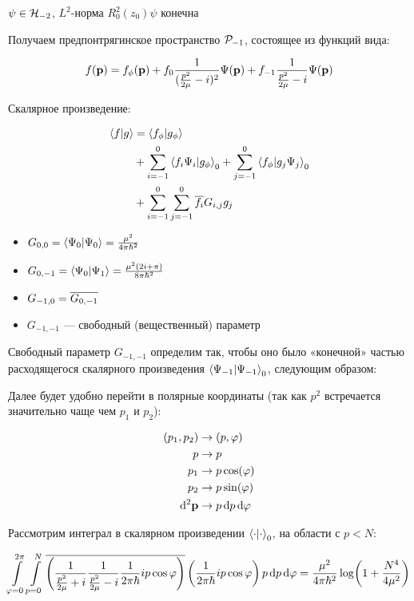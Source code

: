 $\psi \in \mathcal{H}_{-2}$, $L^2$-норма $R_0^2(z_0) \psi$ конечна

Получаем предпонтрягинское пространство $\mathcal{P}_{-1}$, состоящее из функций вида:

\[
f(\vb{p}) = f_\phi(\vb{p}) + f_0 \frac{1}{(\frac{p^2}{2 \mu} - i)^2} \Psi(\vb{p}) + f_{-1} \frac{1}{\frac{p^2}{2 \mu} - i} \Psi(\vb{p})
\]

Скалярное произведение:

\begin{align*}
\ip{f}{g}
&= \ip{f_\phi}{g_\phi} \\
&+ \sum\limits_{i = -1}^0 \ip{f_i \Psi_i}{g_\phi}_0 + \sum\limits_{j = -1}^0 \ip{f_\phi}{g_j \Psi_j}_0 \\
&+ \sum\limits_{i = -1}^0 \sum \limits_{j = -1}^0 \cconj{f_i} G_{i,j} g_j 
\end{align*}

\begin{itemize}
\item $G_{0, 0} = \ip{\Psi_0}{\Psi_0} = \frac{\mu^2}{4 \pi \hbar^2}$
\item $G_{0, -1} = \ip{\Psi_0}{\Psi_1} = \frac{\mu^2 (2 i + \pi)}{8 \pi \hbar^2}$
\item $G_{-1, 0} = \overline{G_{0, -1}}$
\item $G_{-1, -1}$ — свободный (вещественный) параметр
\end{itemize}

Свободный параметр $G_{-1, -1}$ определим так, чтобы оно было «конечной» частью расходящегося скалярного произведения $\ip{\Psi_{-1}}{\Psi_{-1}}_0$, следующим образом:

Далее будет удобно перейти в полярные координаты (так как $p^2$ встречается значительно чаще чем $p_1$ и $p_2$):

\begin{align*}
(p_1, p_2) &\to (p, \varphi) \\
p &\to p \\
p_1 &\to p \cos(\varphi) \\
p_2 &\to p \sin(\varphi) \\
\dd[2]{\vb{p}} &\to p \dd{p} \dd{\varphi}
\end{align*}

Рассмотрим интеграл в скалярном произведении $\ip{\cdot}{\cdot}_0$, на области с $p < N$:

\[
\int\limits_{\varphi = 0}^{2 \pi} \int\limits_{p = 0}^N
\overline{\left(
\frac{1}{\frac{p^2}{2 \mu} + i} \frac{1}{\frac{p^2}{2 \mu} - i} \frac{1}{2 \pi \hbar} i p \cos \varphi
\right)}
\left(
\frac{1}{2 \pi \hbar} i p \cos \varphi
\right)
p \dd{p} \dd{\varphi}
=
\frac{\mu^2}{4 \pi \hbar^2} \log(1 + \frac{N^4}{4 \mu^2})
\]

